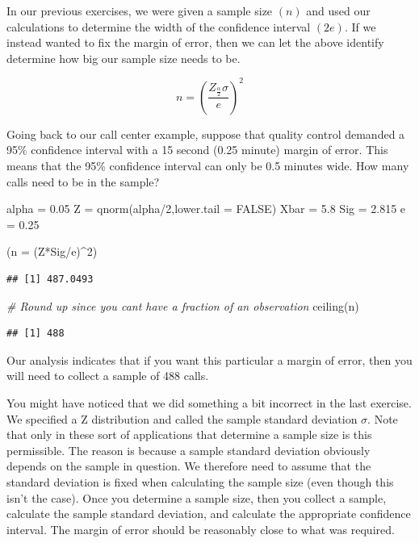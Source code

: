 \documentclass[
]{book}
\newenvironment{Shaded}{\begin{snugshade}}{\end{snugshade}}
\newcommand{\AttributeTok}[1]{\textcolor[rgb]{0.77,0.63,0.00}{#1}}
\newcommand{\CommentTok}[1]{\textcolor[rgb]{0.56,0.35,0.01}{\textit{#1}}}
\newcommand{\ConstantTok}[1]{\textcolor[rgb]{0.00,0.00,0.00}{#1}}
\newcommand{\DecValTok}[1]{\textcolor[rgb]{0.00,0.00,0.81}{#1}}
\newcommand{\FloatTok}[1]{\textcolor[rgb]{0.00,0.00,0.81}{#1}}
\newcommand{\FunctionTok}[1]{\textcolor[rgb]{0.00,0.00,0.00}{#1}}
\newcommand{\NormalTok}[1]{#1}
\newcommand{\OtherTok}[1]{\textcolor[rgb]{0.56,0.35,0.01}{#1}}
\newcommand{\SpecialCharTok}[1]{\textcolor[rgb]{0.00,0.00,0.00}{#1}}
\begin{document}
In our previous exercises, we were given a sample size \((n)\) and used our calculations to determine the width of the confidence interval \((2e)\). If we instead wanted to fix the margin of error, then we can let the above identify determine how big our sample size needs to be.

\[n = \left( \frac{Z_{\frac{\alpha}{2}}\sigma}{e}\right)^2\]

Going back to our call center example, suppose that quality control demanded a 95\% confidence interval with a 15 second (0.25 minute) margin of error. This means that the 95\% confidence interval can only be 0.5 minutes wide. How many calls need to be in the sample?

\begin{Shaded}
\begin{Highlighting}[]
\NormalTok{alpha }\OtherTok{=} \FloatTok{0.05}
\NormalTok{Z }\OtherTok{=} \FunctionTok{qnorm}\NormalTok{(alpha}\SpecialCharTok{/}\DecValTok{2}\NormalTok{,}\AttributeTok{lower.tail =} \ConstantTok{FALSE}\NormalTok{)}
\NormalTok{Xbar }\OtherTok{=} \FloatTok{5.8}
\NormalTok{Sig }\OtherTok{=} \FloatTok{2.815}
\NormalTok{e }\OtherTok{=} \FloatTok{0.25}

\NormalTok{(}\AttributeTok{n =}\NormalTok{ (Z}\SpecialCharTok{*}\NormalTok{Sig}\SpecialCharTok{/}\NormalTok{e)}\SpecialCharTok{\^{}}\DecValTok{2}\NormalTok{)}
\end{Highlighting}
\end{Shaded}

\begin{verbatim}
## [1] 487.0493
\end{verbatim}

\begin{Shaded}
\begin{Highlighting}[]
\CommentTok{\# Round up since you can\textquotesingle{}t have a fraction of an observation}
\FunctionTok{ceiling}\NormalTok{(n)}
\end{Highlighting}
\end{Shaded}

\begin{verbatim}
## [1] 488
\end{verbatim}

Our analysis indicates that if you want this particular a margin of error, then you will need to collect a sample of 488 calls.

You might have noticed that we did something a bit incorrect in the last exercise. We specified a Z distribution and called the sample standard deviation \(\sigma\). Note that only in these sort of applications that determine a sample size is this permissible. The reason is because a sample standard deviation obviously depends on the sample in question. We therefore need to assume that the standard deviation is fixed when calculating the sample size (even though this isn't the case). Once you determine a sample size, then you collect a sample, calculate the sample standard deviation, and calculate the appropriate confidence interval. The margin of error should be reasonably close to what was required.
\end{document}
